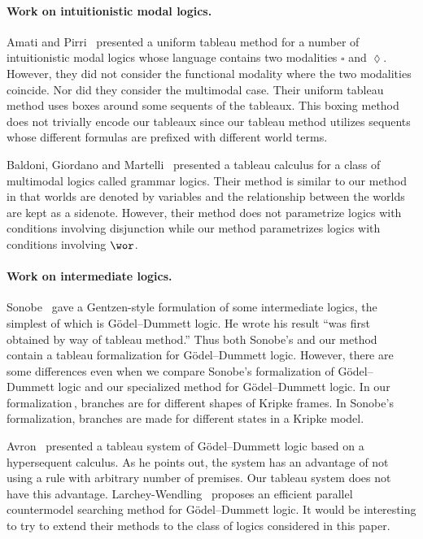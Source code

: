 \documentclass[doctor]{iscs-thesis}
\begin{document}
\paragraph{Work on intuitionistic modal logics.}

Amati and Pirri~\cite{amati94} presented a uniform tableau method for a number of
intuitionistic modal logics whose language contains two modalities
$\square$ and $\lozenge$.
However, they did not consider the functional modality where the two
modalities coincide.  Nor did they consider the multimodal case.
Their uniform tableau method uses boxes around some sequents of the
tableaux.  This boxing method does not trivially encode our tableaux since our
tableau method utilizes sequents whose different formulas are prefixed
with different world terms.

Baldoni, Giordano and Martelli~\cite{baldoni98} presented a tableau
calculus for a class of multimodal logics called grammar logics.
Their method is similar to our method in that worlds are denoted by
variables and the relationship between the worlds are kept as a
sidenote.
However, their method does not parametrize logics with conditions involving
disjunction while our method parametrizes logics with conditions
involving $\wor$.

\paragraph{Work on intermediate logics.}

Sonobe~\cite{sonobe} gave a Gentzen-style formulation of some
intermediate logics, the simplest of which is G\"{o}del--Dummett logic.
He wrote his result ``was first obtained by way of tableau method.''
Thus both Sonobe's and our method contain a tableau formalization for
G\"{o}del--Dummett logic.  However, there are some differences even when
we compare Sonobe's formalization of G\"odel--Dummett logic and our
specialized method for G\"odel--Dummett logic.
In our formalization\,\LB, branches are for different shapes of Kripke
frames.  In Sonobe's formalization, branches are made for different
states in a Kripke model.

Avron~\cite{avron2000} presented a tableau system of G\"odel--Dummett logic
based on a hypersequent calculus.
As he points out, the system has an advantage of not using a rule with
arbitrary number of
premises.  Our tableau system does not have this advantage.
Larchey-Wendling~\cite{countermodelsearch} proposes an efficient parallel
countermodel searching method for G\"odel--Dummett logic.
It would be interesting to try to extend their methods to the
class of logics considered in this paper.
\end{document}
